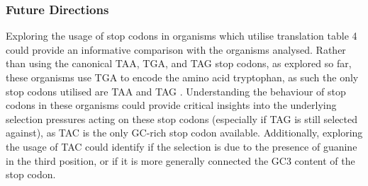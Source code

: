 \documentclass[../main.tex]{subfile}
\begin{document}
    \subsubsection{Future Directions}
        Exploring the usage of stop codons in organisms which utilise translation table 4 could provide an informative comparison with the organisms analysed. Rather than using the canonical TAA, TGA, and TAG stop codons, as explored so far, these organisms use TGA to encode the amino acid tryptophan, as such the only stop codons utilised are TAA and TAG \autocite{translationTable}. Understanding the behaviour of stop codons in these organisms could provide critical insights into the underlying selection pressures acting on these stop codons (especially if TAG is still selected against), as TAC is the only GC-rich stop codon available. Additionally, exploring the usage of TAC could identify if the selection is due to the presence of guanine in the third position, or if it is more generally connected the GC3 content of the stop codon.
\end{document}
